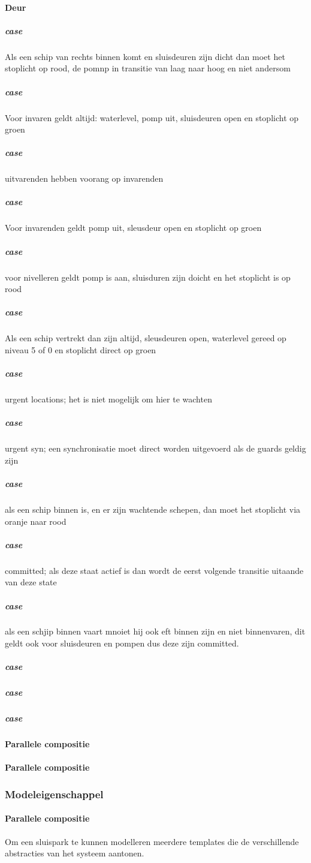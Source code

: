 \paragraph{Deur}


\subparagraph{case}
Als een schip van rechts binnen komt en sluisdeuren zijn dicht dan moet het stoplicht op rood, de pomnp in transitie van laag naar hoog en niet andersom

\subparagraph{case}
Voor invaren geldt altijd: waterlevel, pomp uit, sluisdeuren open en stoplicht op groen

\subparagraph{case}
uitvarenden hebben voorang op invarenden

\subparagraph{case}
Voor invarenden geldt pomp uit, sleusdeur open en stoplicht op groen
\subparagraph{case}
voor nivelleren geldt pomp is aan, sluisduren zijn doicht en het stoplicht is op rood
\subparagraph{case}
Als een schip vertrekt dan zijn altijd, sleusdeuren open, waterlevel gereed op niveau 5 of 0 en stoplicht direct op groen
\subparagraph{case}
urgent locations; het is niet mogelijk om hier te wachten
\subparagraph{case}
urgent syn; een synchronisatie moet direct worden uitgevoerd als de guards geldig zijn

\subparagraph{case}
als een schip binnen is, en er zijn wachtende schepen, dan moet het stoplicht via oranje naar rood
\subparagraph{case}
committed; als deze staat actief is dan wordt de eerst volgende transitie uitaande van deze state
\subparagraph{case}
als een schjip binnen vaart mnoiet hij ook eft binnen zijn en niet binnenvaren, dit geldt ook voor sluisdeuren en pompen dus deze zijn committed.
\subparagraph{case}

\subparagraph{case}

\subparagraph{case}

\paragraph{Parallele compositie}


\paragraph{Parallele compositie}

\subsubsection{Modeleigenschappel}
\paragraph{Parallele compositie}
Om een sluispark te kunnen modelleren meerdere templates die de verschillende abstracties van het systeem aantonen.

